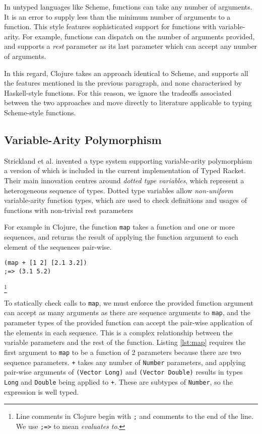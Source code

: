 In untyped languages like Scheme, functions can take any number of arguments. It is an
error to supply less than the minimum number of arguments to a function.
This style features sophisticated support for functions with variable-arity. For example,
functions can dispatch on the number of arguments provided, and supports a \emph{rest} parameter
as its last parameter which can accept any number of arguments.

In this regard, Clojure takes an approach identical to Scheme, and supports all the features
mentioned in the previous paragraph, and none characterised by Haskell-style functions.
For this reason, we ignore the tradeoffs associated between the two approaches 
and move directly to literature applicable to typing Scheme-style functions.

\subsection{Variable-Arity Polymorphism}
\label{sec:variablearity}

Strickland et al. invented a type system supporting variable-arity polymorphism~\cite{STF09}
a version of which is included in the current implementation of Typed Racket.
Their main innovation centres around \emph{dotted type variables}, which represent a heterogeneous sequence
of types. Dotted type variables allow \emph{non-uniform} variable-arity function types,
which are used to check definitions and usages of functions with non-trivial rest parameters

For example in Clojure, the function \lstinline|map| takes a function and one or more sequences,
and returns the result of applying the function argument to each element of the sequences pair-wise.

\begin{lstlisting}[caption=An application of the non-uniform variable-arity function \lstinline|map|, label=lst:map]
(map + [1 2] [2.1 3.2]) 
;=> (3.1 5.2)
\end{lstlisting}\footnote{Line comments in Clojure begin with \lstinline|;| and comments to the end of the line. We use \lstinline|;=>| to mean \emph{evaluates to}.}

To statically check calls to \lstinline|map|, we must enforce the provided function argument can accept as many
arguments as there are sequence arguments to \lstinline|map|, and the parameter types of the provided function can accept
the pair-wise application of the elements in each sequence. This is a complex relationship between the variable parameters and
the rest of the function.
Listing \ref{lst:map} requires the first argument to \lstinline|map| to be a function of 2 parameters because
there are two sequence parameters. \lstinline|+| takes any number of \lstinline|Number| parameters, 
and applying pair-wise arguments of \lstinline|(Vector Long)| and \lstinline|(Vector Double)| 
results in types \lstinline|Long| and \lstinline|Double| being applied to \lstinline|+|. These are subtypes
of \lstinline|Number|, so the expression is well typed.


